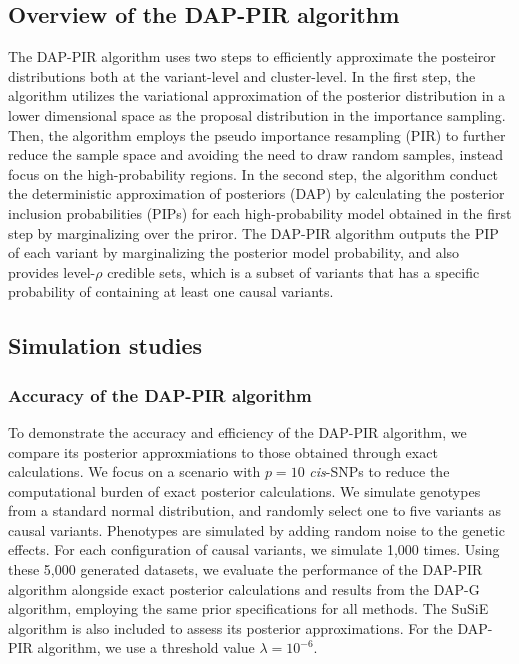 \documentclass[pdflatex,sn-mathphys-num]{sn-jnl}%
\theoremstyle{thmstyleone}%
\theoremstyle{thmstyletwo}%
\theoremstyle{thmstylethree}%
\begin{document}
\subsection{Overview of the DAP-PIR algorithm}\label{subsec1}
The DAP-PIR algorithm uses two steps to efficiently approximate the posteiror distributions both at the variant-level and cluster-level. In the first step, the algorithm utilizes the variational approximation of the posterior distribution in a lower dimensional space as the proposal distribution in the importance sampling. Then, the algorithm employs the pseudo importance resampling (PIR) to further reduce the sample space and avoiding the need to draw random samples, instead focus on the high-probability regions. In the second step, the algorithm conduct the deterministic approximation of posteriors (DAP) by calculating the posterior inclusion probabilities (PIPs) for each high-probability model obtained in the first step by marginalizing over the priror. The DAP-PIR algorithm outputs the PIP of each variant by marginalizing the posterior model probability, and also provides level-$\rho$ credible sets, which is a subset of variants that has a specific probability of containing at least one causal variants.





\subsection{Simulation studies}\label{subsec3}
\subsubsection*{Accuracy of the DAP-PIR algorithm}
To demonstrate the accuracy and efficiency of the DAP-PIR algorithm, we compare its posterior approxmiations to those obtained through exact calculations. We focus on a scenario with $p=10$ \textit{cis}-SNPs to reduce the computational burden of exact posterior calculations. We simulate genotypes from a standard normal distribution, and randomly select one to five variants as causal variants. Phenotypes are simulated by adding random noise to the genetic effects. For each configuration of causal variants, we simulate 1,000 times. Using these 5,000 generated datasets, we evaluate the performance of the DAP-PIR algorithm alongside exact posterior calculations and results from the DAP-G algorithm, employing the same prior specifications for all methods. The SuSiE algorithm is also included to assess its posterior approximations. For the DAP-PIR algorithm, we use a threshold value $\lambda=10^{-6}$.
\end{document}
